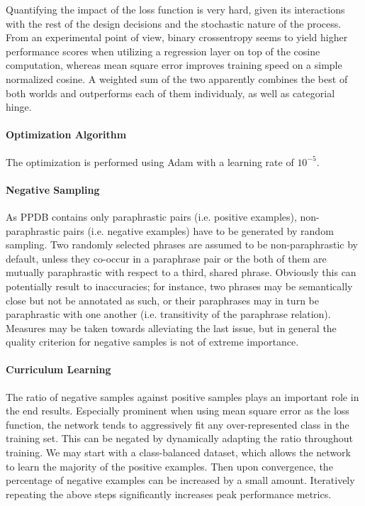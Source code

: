 \documentclass[a4paper,11pt]{article}
\begin{document}
Quantifying the impact of the loss function is very hard, given its interactions with the rest of the design decisions and the stochastic nature of the process. From an experimental point of view, binary crossentropy seems to yield higher performance scores when utilizing a regression layer on top of the cosine computation, whereas mean square error improves training speed on a simple normalized cosine. A weighted sum of the two apparently combines the best of both worlds and outperforms each of them individualy, as well as categorial hinge.

\paragraph{Optimization Algorithm}
The optimization is performed using Adam with a learning rate of $10^{-5}$. 

\paragraph{Negative Sampling}
As PPDB contains only paraphrastic pairs (i.e. positive examples), non-paraphrastic pairs (i.e. negative examples) have to be generated by random sampling. Two randomly selected phrases are assumed to be non-paraphrastic by default, unless they co-occur in a paraphrase pair or the both of them are mutually paraphrastic with respect to a third, shared phrase. Obviously this can potentially result to inaccuracies; for instance, two phrases may be semantically close but not be annotated as such, or their paraphrases may in turn be paraphrastic with one another (i.e. transitivity of the paraphrase relation). Measures may be taken towards alleviating the last issue, but in general the quality criterion for negative samples is not of extreme importance.

\paragraph{Curriculum Learning} The ratio of negative samples against positive samples plays an important role in the end results. Especially prominent when using mean square error as the loss function, the network tends to aggressively fit any over-represented class in the training set. This can be negated by dynamically adapting the ratio throughout training. We may start with a class-balanced dataset, which allows the network to learn the majority of the positive examples. Then upon convergence, the percentage of negative examples can be increased by a small amount. Iteratively repeating the above steps significantly increases peak performance metrics.
\end{document}
